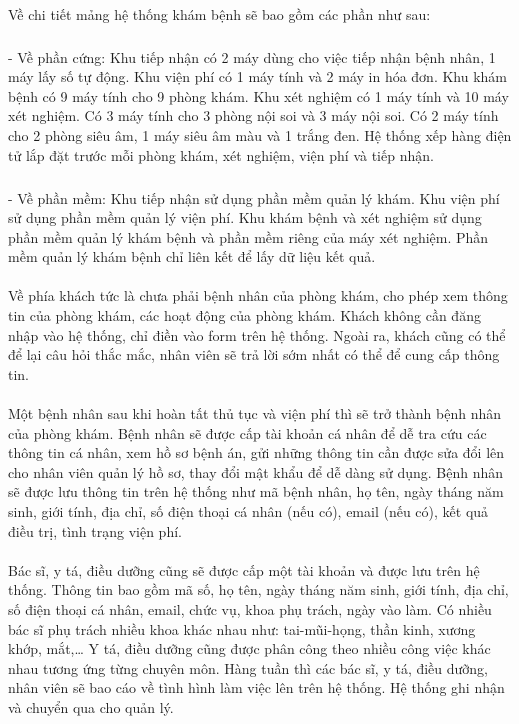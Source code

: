 \documentclass{report}
\begin{document}
	\paragraph{}
	Về chi tiết mảng hệ thống khám bệnh sẽ bao gồm các phần như sau:
	\subparagraph{}
	- Về phần cứng: Khu tiếp nhận có 2 máy dùng cho việc tiếp nhận bệnh nhân, 1 máy lấy số tự động. Khu viện phí có 1 máy tính và 2 máy in hóa đơn. Khu khám bệnh có 9 máy tính cho 9 phòng khám. Khu xét nghiệm có 1 máy tính và 10 máy xét nghiệm. Có 3 máy tính cho 3 phòng nội soi và 3 máy nội soi. Có 2 máy tính cho 2 phòng siêu âm, 1 máy siêu âm màu và 1 trắng đen. Hệ thống xếp hàng điện tử lắp đặt trước mỗi phòng khám, xét nghiệm, viện phí và tiếp nhận.
	\subparagraph{}
	- Về phần mềm: Khu tiếp nhận sử dụng phần mềm quản lý khám. Khu viện phí sử dụng phần mềm quản lý viện phí. Khu khám bệnh và xét nghiệm sử dụng phần mềm quản lý khám bệnh và phần mềm riêng của máy xét nghiệm. Phần mềm quản lý khám bệnh chỉ liên kết để lấy dữ liệu kết quả.
	\paragraph{}
	Về phía khách tức là chưa phải bệnh nhân của phòng khám, cho phép xem thông tin của phòng khám, các hoạt động của phòng khám. Khách không cần đăng nhập vào hệ thống, chỉ điền vào form trên hệ thống. Ngoài ra, khách cũng có thể để lại câu hỏi thắc mắc, nhân viên sẽ trả lời sớm nhất có thể để cung cấp thông tin.
	\paragraph{}
	Một bệnh nhân sau khi hoàn tất thủ tục và viện phí thì sẽ trở thành bệnh nhân của phòng khám. Bệnh nhân sẽ được cấp tài khoản cá nhân để dễ tra cứu các thông tin cá nhân, xem hồ sơ bệnh án, gửi những thông tin cần được sửa đổi lên cho nhân viên quản lý hồ sơ, thay đổi mật khẩu để dễ dàng sử dụng. Bệnh nhân sẽ được lưu thông tin trên hệ thống như mã bệnh nhân, họ tên, ngày tháng năm sinh, giới tính, địa chỉ, số điện thoại cá nhân (nếu có), email (nếu có), kết quả điều trị, tình trạng viện phí.
	\paragraph{}
	Bác sĩ, y tá, điều dưỡng cũng sẽ được cấp một tài khoản và được lưu trên hệ thống. Thông tin bao gồm mã số, họ tên, ngày tháng năm sinh, giới tính, địa chỉ, số điện thoại cá nhân, email, chức vụ, khoa phụ trách, ngày vào làm. Có nhiều bác sĩ phụ trách nhiều khoa khác nhau như: tai-mũi-họng, thần kinh, xương khớp, mắt,… Y tá, điều dưỡng cũng được phân công theo nhiều công việc khác nhau tương ứng từng chuyên môn. Hàng tuần thì các bác sĩ, y tá, điều dưỡng, nhân viên sẽ bao cáo về tình hình làm việc lên trên hệ thống. Hệ thống ghi nhận và chuyển qua cho quản lý.
\end{document}
